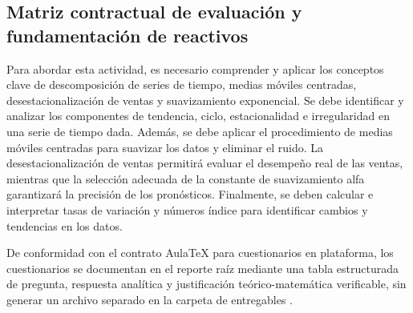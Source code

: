 {\subsection{Matriz contractual de evaluación y fundamentación de reactivos}
Para abordar esta actividad, es necesario comprender y aplicar los conceptos clave de descomposición de series de tiempo, medias móviles centradas, desestacionalización de ventas y suavizamiento exponencial. Se debe identificar y analizar los componentes de tendencia, ciclo, estacionalidad e irregularidad en una serie de tiempo dada. Además, se debe aplicar el procedimiento de medias móviles centradas para suavizar los datos y eliminar el ruido. La desestacionalización de ventas permitirá evaluar el desempeño real de las ventas, mientras que la selección adecuada de la constante de suavizamiento alfa garantizará la precisión de los pronósticos. Finalmente, se deben calcular e interpretar tasas de variación y números índice para identificar cambios y tendencias en los datos.

De conformidad con el contrato AulaTeX para cuestionarios en plataforma, los cuestionarios se documentan en el reporte raíz mediante una tabla estructurada de pregunta, respuesta analítica y justificación teórico-matemática verificable, sin generar un archivo separado en la carpeta de entregables \citep{anderson2012,wackerly2010}.

}
